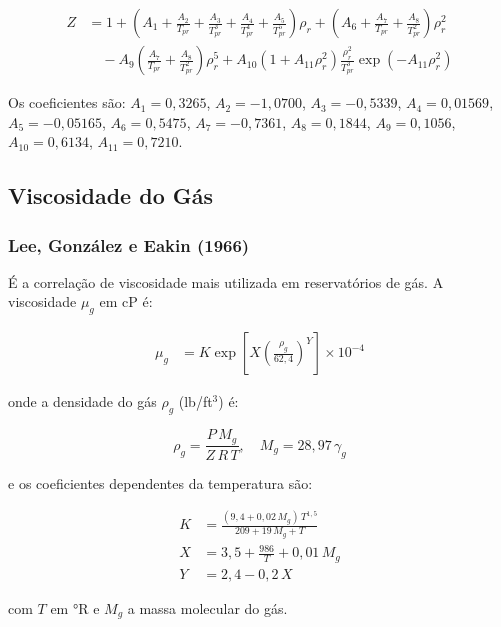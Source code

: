 \documentclass[12pt, a4paper]{article}
\begin{document}
\begin{align}
  Z &= 1
       + \left(A_1 + \frac{A_2}{T_{pr}} + \frac{A_3}{T_{pr}^3}
               + \frac{A_4}{T_{pr}^4} + \frac{A_5}{T_{pr}^5}\right)\rho_r
       + \left(A_6 + \frac{A_7}{T_{pr}} + \frac{A_8}{T_{pr}^2}\right)\rho_r^2 \nonumber\\
     &\quad - A_9\!\left(\frac{A_7}{T_{pr}} + \frac{A_8}{T_{pr}^2}\right)\rho_r^5
       + A_{10}\!\left(1 + A_{11}\rho_r^2\right)
         \frac{\rho_r^2}{T_{pr}^3}\exp\!\left(-A_{11}\rho_r^2\right)
         \label{eq:dak}
\end{align}

\noindent Os coeficientes são: $A_1 = 0{,}3265$, $A_2 = -1{,}0700$,
$A_3 = -0{,}5339$, $A_4 = 0{,}01569$, $A_5 = -0{,}05165$,
$A_6 = 0{,}5475$, $A_7 = -0{,}7361$, $A_8 = 0{,}1844$,
$A_9 = 0{,}1056$, $A_{10} = 0{,}6134$, $A_{11} = 0{,}7210$.

\subsection{Viscosidade do Gás}

\subsubsection{Lee, González e Eakin (1966)}

É a correlação de viscosidade mais utilizada em reservatórios de gás. A viscosidade
$\mu_g$ em cP é:

\begin{align}
  \mu_g &= K \exp\!\left[X \left(\frac{\rho_g}{62{,}4}\right)^Y\right]
            \times 10^{-4} \label{eq:lge}
\end{align}

\noindent onde a densidade do gás $\rho_g$ (lb/ft$^3$) é:

\begin{equation}
  \rho_g = \frac{P\,M_g}{Z\,R\,T}, \quad M_g = 28{,}97\,\gamma_g
\end{equation}

\noindent e os coeficientes dependentes da temperatura são:

\begin{align}
  K &= \frac{(9{,}4 + 0{,}02\,M_g)\,T^{1{,}5}}{209 + 19\,M_g + T} \\
  X &= 3{,}5 + \frac{986}{T} + 0{,}01\,M_g \\
  Y &= 2{,}4 - 0{,}2\,X
\end{align}

\noindent com $T$ em °R e $M_g$ a massa molecular do gás.
\end{document}
